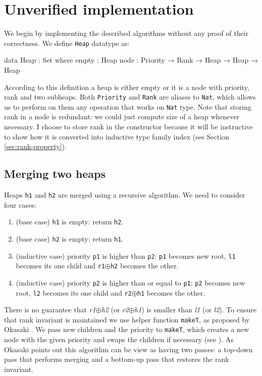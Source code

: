 \section[Unverified implementation]{Unverified implementation} \label{sec:no-proofs}
We begin by implementing the described algorithms without any proof of their correctness. We define \texttt{Heap} datatype as:

\begin{code}
data Heap : Set where
  empty : Heap
  node  : Priority → Rank → Heap → Heap → Heap
\end{code}
\noindent
According to this definition a heap is either empty or it is a node with priority, rank and two subheaps. Both \texttt{Priority} and \texttt{Rank} are aliases to \texttt{Nat}, which allows us to perform on them any operation that works on \texttt{Nat} type. Note that storing rank in a node is redundant: we could just compute size of a heap whenever necessary. I choose to store rank in the constructor because it will be instructive to show how it is converted into inductive type family index (see Section \ref{sec:rank-property}).

\subsection{Merging two heaps}\label{sec:twopass-merge}

Heaps \texttt{h1} and \texttt{h2} are merged using a recursive algorithm. We need to consider four cases:

\begin{enumerate}
 \item (base case) \texttt{h1} is empty: return \texttt{h2}.
 \item (base case) \texttt{h2} is empty: return \texttt{h1}.
 \item (inductive case) priority \texttt{p1} is higher than \texttt{p2}: \texttt{p1} becomes new root, \texttt{l1} becomes its one child and \texttt{r1}$\oplus$\texttt{h2} becomes the other.
 \item (inductive case) priority \texttt{p2} is higher than or equal to \texttt{p1}: \texttt{p2} becomes new root, \texttt{l2} becomes its one child and \texttt{r2}$\oplus$\texttt{h1} becomes the other.
\end{enumerate}
\noindent
There is no guarantee that \textit{r1}$\oplus$\textit{h2} (or \textit{r2}$\oplus$\textit{h1}) is smaller than \textit{l1} (or \textit{l2}). To ensure that rank invariant is maintained we use helper function \texttt{makeT}, as proposed by Okasaki \cite{Oka99}. We pass new children and the priority to \texttt{makeT}, which creates a new node with the given priority and swaps the children if necessary (see ). As Okasaki points out this algorithm can be view as having two passes: a top-down pass that performs merging and a bottom-up pass that restores the rank invariant.

